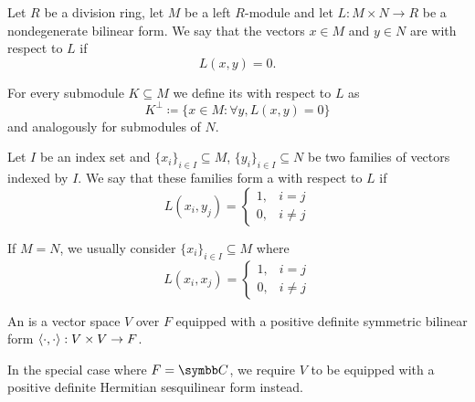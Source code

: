 \begin{definition}\label{def:orthogonality}
  Let \( R \) be a division ring, let \( M \) be a left \( R \)-module and let \( L: M \times N \to R \) be a nondegenerate bilinear form. We say that the vectors \( x \in M \) and \( y \in N \) are  with respect to \( L \) if
  \begin{equation*}
    L(x, y) = 0.
  \end{equation*}

  For every submodule \( K \subseteq M \) we define its  with respect to \( L \) as
  \begin{equation*}
    K^\perp \coloneqq \{ x \in M \colon \forall y, L(x, y) = 0 \}
  \end{equation*}
  and analogously for submodules of \( N \).

  Let \( I \) be an index set and \( \{ x_i \}_{i \in I} \subseteq M \), \( \{ y_i \}_{i \in I} \subseteq N \) be two families of vectors indexed by \( I \). We say that these families form a  with respect to \( L \) if
  \begin{equation*}
    L(x_i, y_j) = \begin{cases}
      1, &i = j \\
      0, &i \neq j
    \end{cases}
  \end{equation*}

  If \( M = N \), we usually consider  \( \{ x_i \}_{i \in I} \subseteq M \) where
  \begin{equation*}
    L(x_i, x_j) = \begin{cases}
      1, &i = j \\
      0, &i \neq j
    \end{cases}
  \end{equation*}
\end{definition}

\begin{definition}\label{def:inner_product_space}
  An  is a vector space \( V \) over \( F \) equipped with a positive definite symmetric bilinear form \( \left\langle \cdot, \cdot \right\rangle: V \times V \to F \).

  In the special case where \( F = \Co \), we require \( V \) to be equipped with a positive definite Hermitian sesquilinear form instead.
\end{definition}

